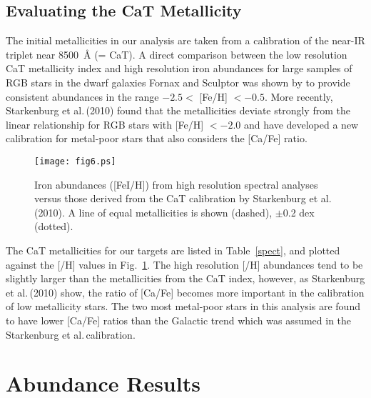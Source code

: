 \documentclass{emulateapj}
\newcommand\etal{{\rm et al.\,}}
\begin{document}
\subsection{Evaluating the CaT Metallicity }

The initial metallicities in our analysis are taken from a
calibration of the near-IR  triplet near 8500~\AA 
(= CaT). 
%
A direct comparison between the low resolution CaT
metallicity index and high resolution iron abundances for
large samples of RGB stars in the dwarf galaxies Fornax
and Sculptor was shown by \citet{Bat08} to
provide consistent abundances in the range 
$-2.5 <$ [Fe/H] $< -0.5$.    More recently, 
Starkenburg \etal (2010) found that the metallicities 
deviate strongly from the linear relationship 
for RGB stars with [Fe/H] $< -2.0$ and
have developed a new calibration for metal-poor stars
that also considers the [Ca/Fe] ratio.

\begin{figure}[t]
\texttt{[image: fig6.ps]}
\caption{Iron abundances ([FeI/H]) from high resolution spectral 
analyses versus those derived from the CaT calibration by   
Starkenburg \etal (2010).   A line of equal metallicities
is shown (dashed), $\pm$0.2 dex (dotted).
}
\label{cat}
\end{figure}


The CaT metallicities for our targets are listed in 
Table~\ref{spect}, and plotted against the [/H] 
values in Fig.~\ref{cat}.
%
The high resolution [/H] abundances tend to be 
slightly larger 
than the metallicities from the CaT index,
however, as Starkenburg \etal (2010) show, the
ratio of [Ca/Fe] 
becomes more important 
in the calibration of low metallicity stars.    The two 
most metal-poor stars in this analysis are found to have
lower [Ca/Fe] ratios than the Galactic trend which was
assumed in the Starkenburg \etal calibration.




\section{Abundance Results }
\end{document}
